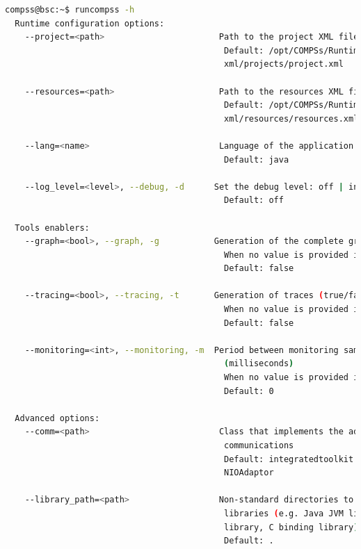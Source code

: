 \begin{lstlisting}[language=bash]
compss@bsc:~$ runcompss -h
  Runtime configuration options:
    --project=<path>                       Path to the project XML file
                                            Default: /opt/COMPSs/Runtime/configuration/
                                            xml/projects/project.xml
                                            
    --resources=<path>                     Path to the resources XML file
                                            Default: /opt/COMPSs/Runtime/configuration/
                                            xml/resources/resources.xml
                                            
    --lang=<name>                          Language of the application (java/c/python)
                                            Default: java
                                            
    --log_level=<level>, --debug, -d      Set the debug level: off | info | debug
                                            Default: off

  Tools enablers:
    --graph=<bool>, --graph, -g           Generation of the complete graph (true/false)
                                            When no value is provided it is set to true
                                            Default: false
                                            
    --tracing=<bool>, --tracing, -t       Generation of traces (true/false)
                                            When no value is provided it is set to true
                                            Default: false
                                            
    --monitoring=<int>, --monitoring, -m  Period between monitoring samples 
                                            (milliseconds)
                                            When no value is provided it is set to 2000
                                            Default: 0

  Advanced options:
    --comm=<path>                          Class that implements the adaptor for 
                                            communications
                                            Default: integratedtoolkit.nio.master.
                                            NIOAdaptor
                                            
    --library_path=<path>                  Non-standard directories to search for 
                                            libraries (e.g. Java JVM library, Python 
                                            library, C binding library) 
                                            Default: .
                                            

\end{lstlisting}
